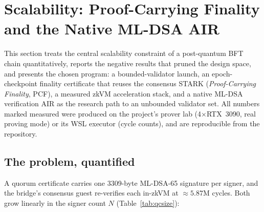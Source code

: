 \documentclass[11pt]{article}
\newcommand{\mldsa}{ML\mbox{-}DSA\mbox{-}65}
\theoremstyle{plain}
\theoremstyle{definition}
\theoremstyle{remark}
\begin{document}
\section{Scalability: Proof-Carrying Finality and the Native ML-DSA AIR}
\label{sec:scalability}

This section treats the central scalability constraint of a post-quantum BFT
chain quantitatively, reports the negative results that pruned the design
space, and presents the chosen program: a bounded-validator launch, an
epoch-checkpoint finality certificate that reuses the consensus STARK
(\emph{Proof-Carrying Finality}, PCF), a measured zkVM acceleration stack,
and a native ML-DSA verification AIR as the research path to an unbounded
validator set. All numbers marked measured were produced on the project's
prover lab (4$\times$RTX~3090, real proving mode) or its WSL executor (cycle
counts), and are reproducible from the repository.

\subsection{The problem, quantified}
\label{sec:qc-problem}

A quorum certificate carries one 3309-byte \mldsa{} signature per signer, and
the bridge's consensus guest re-verifies each in-zkVM at
$\approx 5.87$M cycles. Both grow linearly in the signer count $N$
(Table~\ref{tab:qcsize}):

\begin{table}[ht]\centering
{}
\caption{Linear growth of the post-quantum QC. The linear term propagates
into block size (4 MiB ceiling), gossip, light-client bandwidth,
bridge-prover cost, archive growth, and catch-up latency.}
\label{tab:qcsize}
\end{table}
\end{document}

